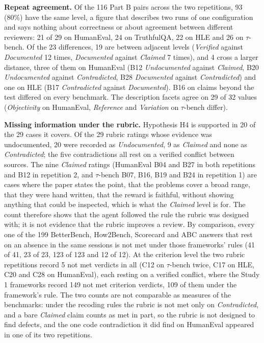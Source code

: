 \documentclass[10pt,conference]{IEEEtran}
\begin{document}
\textbf{Repeat agreement.} Of the 116 Part B pairs across the two repetitions, 93 (80\%) have the same level, a figure that describes two runs of one configuration and says nothing about correctness or about agreement between different reviewers: 21 of 29 on HumanEval, 24 on TruthfulQA, 22 on HLE and 26 on $\tau$-bench. Of the 23 differences, 19 are between adjacent levels (\emph{Verified} against \emph{Documented} 12 times, \emph{Documented} against \emph{Claimed} 7 times), and 4 cross a larger distance, three of them on HumanEval (B12 \emph{Undocumented} against \emph{Claimed}, B20 \emph{Undocumented} against \emph{Contradicted}, B28 \emph{Documented} against \emph{Contradicted}) and one on HLE (B17 \emph{Contradicted} against \emph{Documented}). B16 on claims beyond the test differed on every benchmark. The description facets agree on 29 of 32 values (\emph{Objectivity} on HumanEval, \emph{Reference} and \emph{Variation} on $\tau$-bench differ).

\textbf{Missing information under the rubric.} Hypothesis H4 is supported in 20 of the 29 cases it covers. Of the 29 rubric ratings whose evidence was undocumented, 20 were recorded as \emph{Undocumented}, 9 as \emph{Claimed} and none as \emph{Contradicted}; the five contradictions all rest on a verified conflict between sources. The nine \emph{Claimed} ratings (HumanEval B04 and B27 in both repetitions and B12 in repetition 2, and $\tau$-bench B07, B16, B19 and B24 in repetition 1) are cases where the paper states the point, that the problems cover a broad range, that they were hand written, that the reward is faithful, without showing anything that could be inspected, which is what the \emph{Claimed} level is for. The count therefore shows that the agent followed the rule the rubric was designed with; it is not evidence that the rubric improves a review. By comparison, every one of the 199 BetterBench, How2Bench, Scorecard and ABC answers that rest on an absence in the same sessions is not met under those frameworks' rules (41 of 41, 23 of 23, 123 of 123 and 12 of 12). At the criterion level the two rubric repetitions record 5 not met verdicts in all (C12 on $\tau$-bench twice, C17 on HLE, C20 and C28 on HumanEval), each resting on a verified conflict, where the Study 1 frameworks record 149 not met criterion verdicts, 109 of them under the framework's rule. The two counts are not comparable as measures of the benchmarks: under the recoding rules the rubric is not met only on \emph{Contradicted}, and a bare \emph{Claimed} claim counts as met in part, so the rubric is not designed to find defects, and the one code contradiction it did find on HumanEval appeared in one of its two repetitions.
\end{document}
